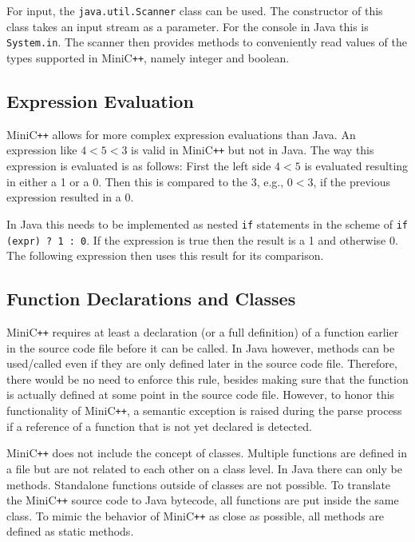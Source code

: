 For input, the \verb|java.util.Scanner| class can be used. The constructor of this class takes an input stream as a parameter. For the console in Java this is \verb|System.in|. The scanner then provides methods to conveniently read values of the types supported in MiniC\verb|++|, namely integer and boolean.

\subsection{Expression Evaluation}

MiniC\verb|++| allows for more complex expression evaluations than Java. An expression like $4 < 5 < 3$ is valid in MiniC\verb|++| but not in Java. The way this expression is evaluated is as follows: First the left side $4 < 5$ is evaluated resulting in either a 1 or a 0. Then this is compared to the 3, e.g., $0 < 3$, if the previous expression resulted in a 0. 

In Java this needs to be implemented as nested \verb|if| statements in the scheme of \verb|if (expr) ? 1 : 0|. If the expression is true then the result is a 1 and otherwise 0. The following expression then uses this result for its comparison.

\subsection{Function Declarations and Classes}

MiniC\verb|++| requires at least a declaration (or a full definition) of a function earlier in the source code file before it can be called. In Java however, methods can be used/called even if they are only defined later in the source code file. Therefore, there would be no need to enforce this rule, besides making sure that the function is actually defined at some point in the source code file. However, to honor this functionality of MiniC\verb|++|, a semantic exception is raised during the parse process if a reference of a function that is not yet declared is detected. 

MiniC\verb|++| does not include the concept of classes. Multiple functions are defined in a file but are not related to each other on a class level. In Java there can only be methods. Standalone functions outside of classes are not possible. To translate the MiniC\verb|++| source code to Java bytecode, all functions are put inside the same class. To mimic the behavior of MiniC\verb|++| as close as possible, all methods are defined as static methods.  


